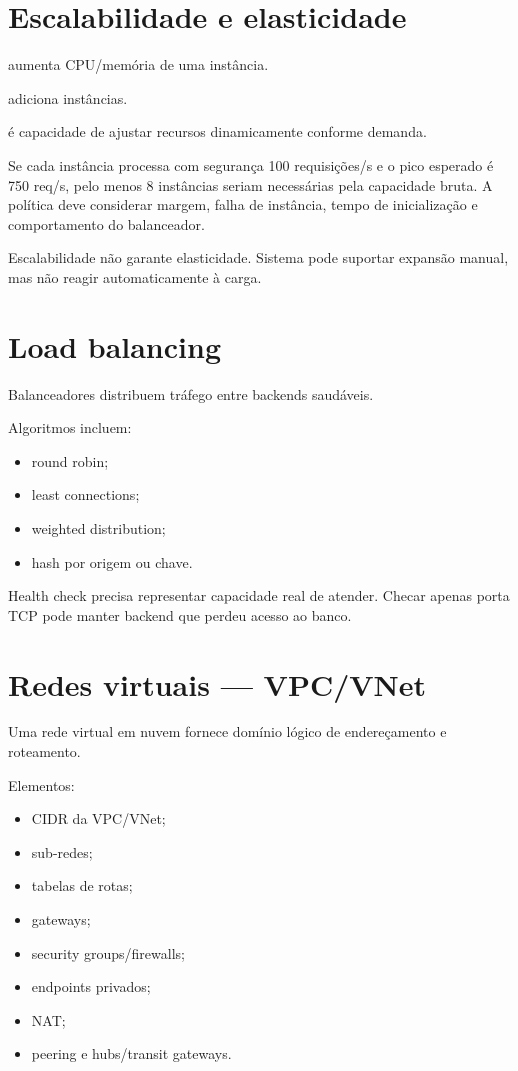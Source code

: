 \section{Escalabilidade e elasticidade}

 aumenta CPU/memória de uma instância.

 adiciona instâncias.

 é capacidade de ajustar recursos dinamicamente conforme demanda.

\begin{exemplo}[autoscaling]
Se cada instância processa com segurança 100 requisições/s e o pico esperado é 750 req/s, pelo menos 8 instâncias seriam necessárias pela capacidade bruta. A política deve considerar margem, falha de instância, tempo de inicialização e comportamento do balanceador.
\end{exemplo}

Escalabilidade não garante elasticidade. Sistema pode suportar expansão manual, mas não reagir automaticamente à carga.

\section{Load balancing}

Balanceadores distribuem tráfego entre backends saudáveis.

Algoritmos incluem:
\begin{itemize}
\item round robin;
\item least connections;
\item weighted distribution;
\item hash por origem ou chave.
\end{itemize}

Health check precisa representar capacidade real de atender. Checar apenas porta TCP pode manter backend que perdeu acesso ao banco.

\section{Redes virtuais — VPC/VNet}

Uma rede virtual em nuvem fornece domínio lógico de endereçamento e roteamento.

Elementos:
\begin{itemize}
\item CIDR da VPC/VNet;
\item sub-redes;
\item tabelas de rotas;
\item gateways;
\item security groups/firewalls;
\item endpoints privados;
\item NAT;
\item peering e hubs/transit gateways.
\end{itemize}

